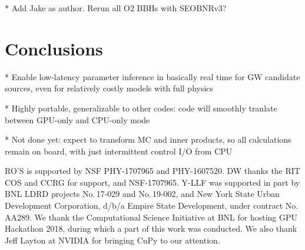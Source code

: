 \documentclass[twocolumn,prd,nofootinbib]{revtex4}
\begin{document}
* Add Jake as author.  Rerun all O2 BBHs with SEOBNRv3?

\section{Conclusions}

* Enable low-latency parameter inference in basically real time for GW candidate sources, even for relatively costly
models with full physics


* Highly portable, generalizable to other codes: code will smoothly tranlate between GPU-only and CPU-only mode


* Not done yet: expect to transform MC and inner products, so all calculations remain on board, with just intermittent
control I/O from CPU


\begin{acknowledgements}
RO'S is supported by NSF PHY-1707965 and PHY-1607520.
DW thanks the RIT COS and CCRG for support, and  NSF-1707965.
Y-LLF was supported in part by BNL LDRD projects No.\,17-029 and No.\,19-002, 
and New York State Urban Development Corporation, d/b/a Empire State Development, under contract No.\,AA289.
We thank the Computational Science Initiative at BNL for hosting GPU Hackathon 2018, during which a part of this work was conducted. We also thank Jeff Layton at NVIDIA for bringing CuPy to our attention.
\end{acknowledgements}



\end{document}
